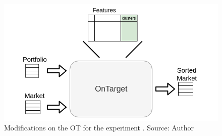 \begin{figure}[H]
   \centering
   \includegraphics[width=\linewidth]{fig/ch3-clusters-as-features.png}
   \caption{Modifications on the OT for the experiment \nameExperimentII{}. Source: Author}
   \label{fig:clusters-as-features}
\end{figure}